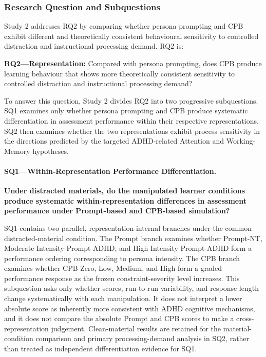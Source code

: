 \subsubsection{Research Question and Subquestions}
\label{subsubsec:study2-rq}

Study 2 addresses RQ2 by comparing whether persona prompting and CPB exhibit different and theoretically consistent behavioural sensitivity to controlled distraction and instructional processing demand. RQ2 is:

{\small
\textbf{RQ2---Representation:} Compared with persona prompting, does CPB produce learning behaviour that shows more theoretically consistent sensitivity to controlled distraction and instructional processing demand?
\par}

To answer this question, Study 2 divides RQ2 into two progressive subquestions. SQ1 examines only whether persona prompting and CPB produce systematic differentiation in assessment performance within their respective representations. SQ2 then examines whether the two representations exhibit process sensitivity in the directions predicted by the targeted ADHD-related Attention and Working-Memory hypotheses.

\paragraph{SQ1---Within-Representation Performance Differentiation.}

{\small
\raggedright
\textbf{Under distracted materials, do the manipulated learner conditions produce systematic within-representation differences in assessment performance under Prompt-based and CPB-based simulation?}
\par}

SQ1 contains two parallel, representation-internal branches under the common distracted-material condition. The Prompt branch examines whether Prompt-NT, Moderate-Intensity Prompt-ADHD, and High-Intensity Prompt-ADHD form a performance ordering corresponding to persona intensity. The CPB branch examines whether CPB Zero, Low, Medium, and High form a graded performance response as the frozen constraint-severity level increases. This subquestion asks only whether scores, run-to-run variability, and response length change systematically with each manipulation. It does not interpret a lower absolute score as inherently more consistent with ADHD cognitive mechanisms, and it does not compare the absolute Prompt and CPB scores to make a cross-representation judgement. Clean-material results are retained for the material-condition comparison and primary processing-demand analysis in SQ2, rather than treated as independent differentiation evidence for SQ1.

